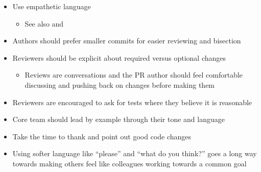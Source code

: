 \documentclass[letterpaper,10pt,openany,oneside,english]{sphinxmanual}
\begin{document}
\begin{itemize}
\item {} 
\sphinxAtStartPar
Use empathetic language
\begin{itemize}
\item {} 
\sphinxAtStartPar
See also 
and 

\end{itemize}

\item {} 
\sphinxAtStartPar
Authors should prefer smaller commits for easier reviewing and bisection

\item {} 
\sphinxAtStartPar
Reviewers should be explicit about required versus optional changes
\begin{itemize}
\item {} 
\sphinxAtStartPar
Reviews are conversations and the PR author should feel comfortable
discussing and pushing back on changes before making them

\end{itemize}

\item {} 
\sphinxAtStartPar
Reviewers are encouraged to ask for tests where they believe it is reasonable

\item {} 
\sphinxAtStartPar
Core team should lead by example through their tone and language

\item {} 
\sphinxAtStartPar
Take the time to thank and point out good code changes

\item {} 
\sphinxAtStartPar
Using softer language like “please” and “what do you think?” goes a long way
towards making others feel like colleagues working towards a common goal

\end{itemize}
\end{document}
